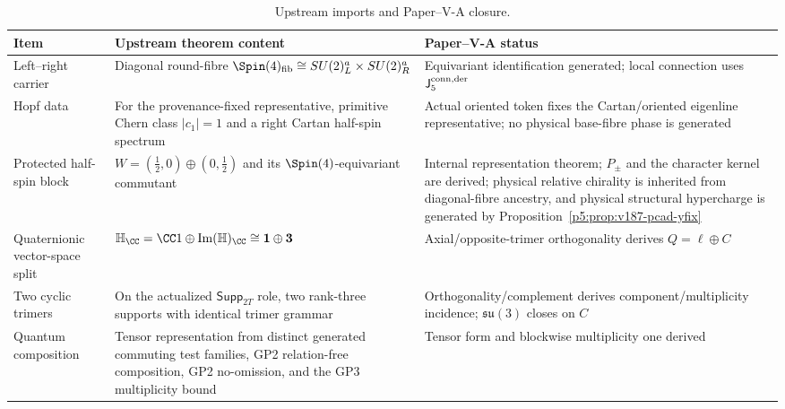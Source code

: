\documentclass[12pt,a4paper]{article}
\begin{document}
\begin{table}[!htbp]
\centering
\caption[Upstream imports and Paper-V-A closure]{Upstream imports and Paper--V-A closure.}
\label{p5:tab:native-ingredients}
\scriptsize
\setlength{\tabcolsep}{3pt}
\renewcommand{\arraystretch}{1.2}
\begin{tabularx}{\textwidth}{>{\raggedright\arraybackslash}p{}
                                >{\raggedright\arraybackslash}X
                                >{\raggedright\arraybackslash}p{}}
\toprule
\textbf{Item} & \textbf{Upstream theorem content} & \textbf{Paper--V-A status} \\
\midrule
Left--right carrier &
Diagonal round-fibre
\(\Spin(4)_{\rm fib}\cong SU(2)^a_L\times SU(2)^a_R\) &
Equivariant identification generated; local connection uses
\(\mathsf J_5^{\rm conn,der}\) \\

Hopf data &
For the provenance-fixed representative, primitive Chern class \(|c_1|=1\) and a
right Cartan half-spin spectrum &
Actual oriented token fixes the Cartan/oriented eigenline representative; no physical base-fibre phase is generated \\

Protected half-spin block &
\(W=(\frac12,0)\oplus(0,\frac12)\) and its
\(\Spin(4)\)-equivariant commutant &
Internal representation theorem; \(P_\pm\) and the character kernel are
derived; physical relative chirality is inherited from diagonal-fibre ancestry,
and physical structural hypercharge is generated by
Proposition~\ref{p5:prop:v187-pcad-yfix} \\

Quaternionic vector-space split &
\(\mathbb H_\CC=\CC1\oplus\operatorname{Im}(\mathbb H)_\CC
\cong\mathbf1\oplus\mathbf3\) &
Axial/opposite-trimer orthogonality derives
\(Q=\ell\oplus C\) \\

Two cyclic trimers &
On the actualized \(\mathsf{Supp}_{2T}\) role, two rank-three supports with identical trimer
grammar &
Orthogonality/complement derives component/multiplicity incidence;
\(\mathfrak{su}(3)\) closes on \(C\) \\

Quantum composition &
Tensor representation from distinct generated commuting test families, GP2
relation-free composition, GP2 no-omission, and the GP3 multiplicity bound &
Tensor form and blockwise multiplicity one derived \\


\end{tabularx}
\end{table}
\end{document}
